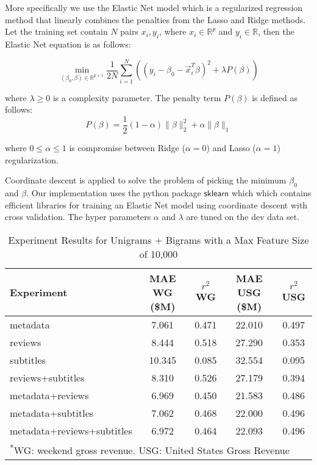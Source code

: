 \documentclass[11pt]{article}
\begin{document}
More specifically we use the Elastic Net model which is a regularized regression method
that linearly combines the penalties from the Lasso and Ridge methods. Let the training
set contain $N$ pairs $x_i,y_i$, where $x_i \in \mathbb{R}^p$ and $y_i \in \mathbb{R}$,
then the Elastic Net equation is as follows:

$$ \min_{(\beta_0, \beta) \in \mathbb{R}^{p+1}} \frac{1}{2N} \sum_{i=1}^N \left(
(y_i - \beta_0 - \vec{x}_i^T\beta)^2 + \lambda P(\beta)\right)$$

\noindent where $\lambda \geq 0$ is a complexity parameter. The penalty term $P(\beta)$
is defined as follows:
$$P(\beta) = \frac{1}{2}(1 - \alpha) \| \beta \|_2^2 + \alpha \|\beta\|_1$$

\noindent where $0 \leq \alpha \leq 1$ is compromise between Ridge ($\alpha = 0$) and
Lasso ($\alpha = 1$) regularization.

Coordinate descent is applied to solve the problem of picking the minimum $\beta_0$ and
$\beta$. Our implementation uses the python package $\mathsf{sklearn}$ which which
contains efficient libraries for training an Elastic Net model using coordinate descent
with cross validation. The hyper parameters $\alpha$ and $\lambda$ are tuned on the dev
data set.

\begin{table*}[t]
\caption{Experiment Results for Unigrams + Bigrams with a Max Feature Size of 10,000}
\centering
\begin{tabular}{|l c c c c|}
  \hline
  \textbf{Experiment} & \textbf{MAE WG (\$M)} & \textbf{$r^2$ WG} & \textbf{MAE USG (\$M)}
  & \textbf{$r^2$ USG}\\
  \hline
  metadata                    &  7.061 &  0.471  & 22.010  & 0.497\\
  reviews                     &  8.444 &  0.518  & 27.290  & 0.353\\
  subtitles                   & 10.345 &  0.085  & 32.554  & 0.095\\
  reviews+subtitles           &  8.310 &  0.526  & 27.179  & 0.394\\
  metadata+reviews            &  6.969 &  0.450  & 21.583  & 0.486\\
  metadata+subtitles          &  7.062 &  0.468  & 22.000  & 0.496\\
  metadata+reviews+subtitles  &  6.972 &  0.464  & 22.093  & 0.496\\
  \hline
  \multicolumn{5}{l}{\textsuperscript{*}\footnotesize{WG: weekend gross revenue. USG:
  United States Gross Revenue}}
\end{tabular}
\end{table*}
\end{document}

